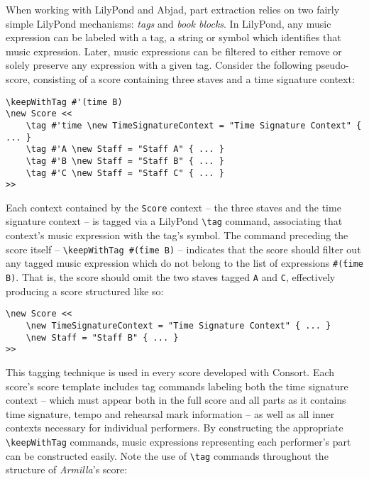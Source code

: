 When working with LilyPond and Abjad, part extraction relies on two fairly
simple LilyPond mechanisms: \emph{tags} and \emph{book blocks}. In LilyPond,
any music expression can be labeled with a tag, a string or symbol which
identifies that music expression. Later, music expressions can be filtered to
either remove or solely preserve any expression with a given tag. Consider the
following pseudo-score, consisting of a score containing three staves and a
time signature context:

\begin{singlespacing}
\vspace{-0.5\baselineskip}
\begin{verbatim}
\keepWithTag #'(time B)
\new Score <<
    \tag #'time \new TimeSignatureContext = "Time Signature Context" { ... }
    \tag #'A \new Staff = "Staff A" { ... }
    \tag #'B \new Staff = "Staff B" { ... }
    \tag #'C \new Staff = "Staff C" { ... }
>>
\end{verbatim}
\end{singlespacing}

\noindent Each context contained by the \texttt{Score} context -- the three
staves and the time signature context -- is tagged via a LilyPond
\texttt{\textbackslash{}tag} command, associating that context's music
expression with the tag's symbol. The command preceding the score itself --
\texttt{\textbackslash{}keepWithTag \#\'(time B)} -- indicates that the score
should filter out any tagged music expression which do not belong to the list
of expressions \texttt{\#\'(time B)}. That is, the score should omit the two
staves tagged \texttt{A} and \texttt{C}, effectively producing a score
structured like so:

\begin{singlespacing}
\vspace{-0.5\baselineskip}
\begin{verbatim}
\new Score <<
    \new TimeSignatureContext = "Time Signature Context" { ... }
    \new Staff = "Staff B" { ... }
>>
\end{verbatim}
\end{singlespacing}

\noindent This tagging technique is used in every score developed with Consort.
Each score's score template includes tag commands labeling both the time
signature context -- which must appear both in the full score and all parts as
it contains time signature, tempo and rehearsal mark information -- as well as
all inner contexts necessary for individual performers. By constructing the
appropriate \texttt{\textbackslash{}keepWithTag} commands, music expressions
representing each performer's part can be constructed easily.
Note the use of \texttt{\textbackslash{}tag} commands throughout the structure
of \emph{Armilla}'s score:

